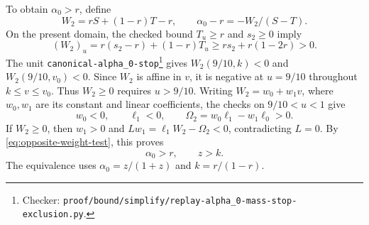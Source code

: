 \documentclass[11pt]{article}
\theoremstyle{remark}
\theoremstyle{plain}
\begin{document}
To obtain $\alpha_0>r$, define
\begin{equation}
 W_2=rS+(1-r)T-r,\qquad \alpha_0-r=-W_2/(S-T).
 \label{eq:opposite-weight-test}
\end{equation}
On the present domain, the checked bound $T_u\ge r$ and $s_2\ge0$
imply
\[
 (W_2)_u=r(s_2-r)+(1-r)T_u
 \ge rs_2+r(1-2r)>0.
\]
The unit \nolinkurl{canonical-alpha_0-stop}\footnote{Checker:
\nolinkurl{proof/bound/simplify/replay-alpha_0-mass-stop-exclusion.py}.\label{fn:checker-canonical-alpha_0-stop}} gives $W_2(9/10,k)<0$ and
$W_2(9/10,v_0)<0$. Since $W_2$ is affine in $v$, it is negative
at $u=9/10$ throughout $k\le v\le v_0$.
Thus $W_2\ge0$ requires $u>9/10$.
Writing $W_2=w_0+w_1v$, where $w_0,w_1$ are its constant and
linear coefficients, the checks on $9/10<u<1$ give
\begin{equation}
 w_0<0,\qquad \ell_1<0,\qquad
 \Omega_2=w_0\ell_1-w_1\ell_0>0.
 \label{eq:opposite-weight-coefficients}
\end{equation}
If $W_2\ge0$, then $w_1>0$ and
$Lw_1=\ell_1W_2-\Omega_2<0$, contradicting $L=0$.
By \eqref{eq:opposite-weight-test}, this proves
\begin{equation}
 \alpha_0>r,\qquad z>k.
 \label{eq:left-lower-weight}
\end{equation}
The equivalence uses $\alpha_0=z/(1+z)$ and $k=r/(1-r)$.
\end{document}
